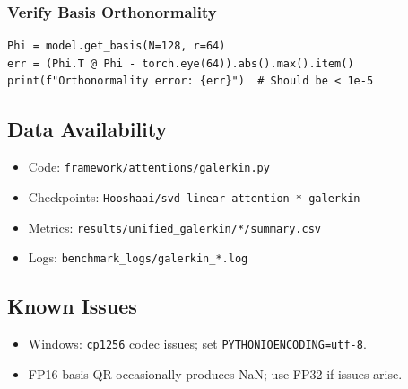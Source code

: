 \subsubsection{Verify Basis Orthonormality}

\begin{lstlisting}
Phi = model.get_basis(N=128, r=64)
err = (Phi.T @ Phi - torch.eye(64)).abs().max().item()
print(f"Orthonormality error: {err}")  # Should be < 1e-5
\end{lstlisting}

\subsection{Data Availability}

\begin{itemize}
\item Code: \texttt{framework/attentions/galerkin.py}
\item Checkpoints: \texttt{Hooshaai/svd-linear-attention-*-galerkin}
\item Metrics: \texttt{results/unified\_galerkin/*/summary.csv}
\item Logs: \texttt{benchmark\_logs/galerkin\_*.log}

\end{itemize}
\subsection{Known Issues}

\begin{itemize}
\item Windows: \texttt{cp1256} codec issues; set \texttt{PYTHONIOENCODING=utf-8}.
\item FP16 basis QR occasionally produces NaN; use FP32 if issues arise.

\end{itemize}
